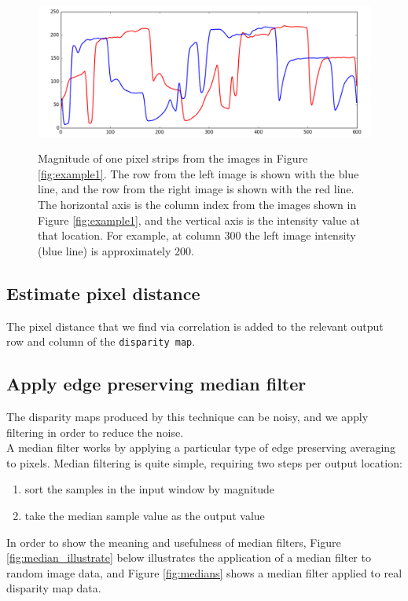 \documentclass[11pt,fleqn]{article}
\begin{document}
\begin{figure}[!h]
\begin{mdframed}
\centering
\includegraphics[width=1\textwidth]{images/strips.png} \\[2pt]
\caption[Intensity of the one pixel strips taken from the images in Figure \ref{fig:example1}]{Magnitude of one pixel strips from the images in Figure \ref{fig:example1}. The row from the left image is shown with the blue line, and the row from the right image is shown with the red line. The horizontal axis is the column index from the images shown in Figure \ref{fig:example1}, and the vertical axis is the intensity value at that location. For example, at column 300 the left image intensity (blue line) is approximately 200.}
\label{fig:strips}
\end{mdframed}
\end{figure}

\subsection{Estimate pixel distance}
The pixel distance that we find via correlation is added to the relevant output row and column of the \texttt{disparity map}.

\subsection{Apply edge preserving median filter}

The disparity maps produced by this technique can be noisy, and we apply filtering in order to reduce the noise.\\[5pt]
%
A median filter works by applying a particular type of edge preserving averaging to pixels. Median filtering is quite simple, requiring two steps per output location:

\newpage
\begin{enumerate}
\item sort the samples in the input window by magnitude
\item take the median sample value as the output value
\end{enumerate}
%
In order to show the meaning and usefulness of median filters, Figure \ref{fig:median_illustrate} below illustrates the application of a median filter to random image data, and Figure \ref{fig:medians} shows a median filter applied to real disparity map data.\\
\end{document}
